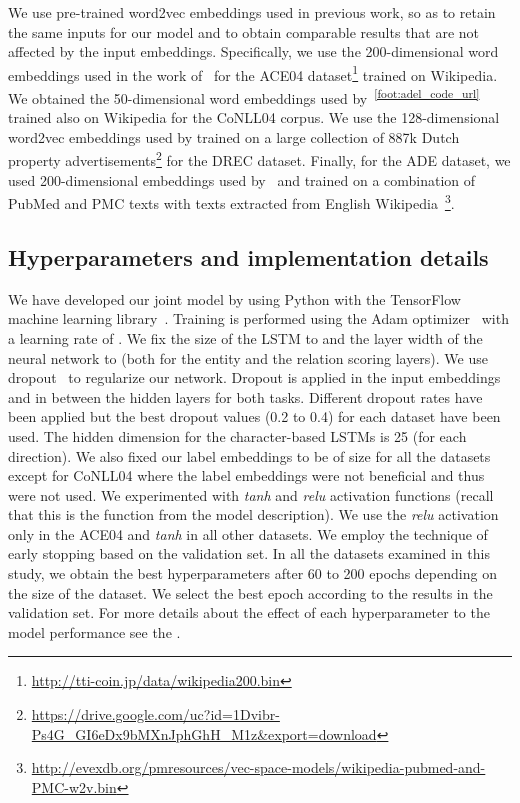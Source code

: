 \documentclass[review]{elsarticle}
\begin{document}
\noindent We use pre-trained word2vec embeddings used in previous work, so as to retain the same inputs for our model and to obtain comparable results that are not affected by the input embeddings. Specifically, we use the 200-dimensional word embeddings used in the work of~\cite{miwa:16} for the ACE04 dataset\footnote{\url{http://tti-coin.jp/data/wikipedia200.bin}} trained on Wikipedia. We obtained the 50-dimensional word embeddings used by~\cite{heike:17}\textsuperscript{\ref{foot:adel_code_url}} trained also on Wikipedia for the CoNLL04 corpus. We use the 128-dimensional word2vec embeddings used by \cite{bekoulis:18} trained on a large collection of 887k Dutch property advertisements\footnote{\url{https://drive.google.com/uc?id=1Dvibr-Ps4G_GI6eDx9bMXnJphGhH_M1z&export=download}} for the DREC dataset. Finally, for the ADE dataset, we used 200-dimensional embeddings used by~\cite{li:17} and trained on a combination of PubMed and PMC texts with texts extracted from English Wikipedia~\citep{moen:13}\footnote{\url{http://evexdb.org/pmresources/vec-space-models/wikipedia-pubmed-and-PMC-w2v.bin}}.


\subsection{Hyperparameters and implementation details}
\label{sec:hyperparameters}
\noindent We have developed our joint model by using Python with the TensorFlow machine learning library~\citep{abadi:16}.
Training is performed using the Adam optimizer~\citep{kingma:14} with a learning rate of . We fix the size of the LSTM to  and the layer width of the neural network to  (both for the entity and the relation scoring layers). We use dropout~\citep{srivastava:14} to regularize our network. Dropout is applied in the input embeddings and in between the hidden layers for both tasks. Different
dropout rates have been applied but the best dropout values (0.2 to 0.4) for each dataset have been used. 
The hidden dimension for the character-based LSTMs is 25 (for each direction). We also fixed our label embeddings to be of size  for all the datasets except for CoNLL04 where the label embeddings were not beneficial and thus were not used.
We experimented with \emph{tanh} and \emph{relu} activation functions (recall that this is the function  from the model description). We use the \emph{relu} activation only in the ACE04 and \emph{tanh} in all other datasets. We employ the technique of early stopping based on the validation set.
In all the datasets examined in this study, we obtain the best hyperparameters after 60 to 200 epochs depending on the size of the dataset. We select the best epoch according to the results in the validation set. For more details about the effect of each hyperparameter to the model performance see the .
\end{document}
